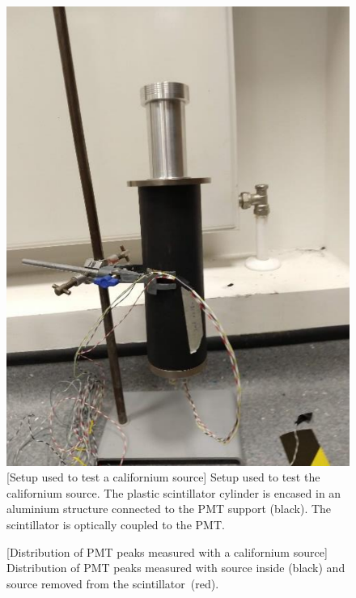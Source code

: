 \begin{figure}
	\begin{minipage}[t]{0.53\textwidth}
		\centering
		\includegraphics[width=0.48\linewidth]{pics/device.png}
		[Setup used to test a californium source]%
		{Setup used to test the californium source.
		The plastic scintillator cylinder is encased in an aluminium structure %
		connected to the PMT support (black).
		The scintillator is optically coupled to the PMT.}
		\label{fig:setup}
	\end{minipage}
	\hfill
	\begin{minipage}[t]{0.45\textwidth}
		\centering
		\resizebox{\textwidth}{!}{}
		[Distribution of PMT peaks measured with a californium source]%
		{Distribution of PMT peaks measured with source inside (black) and source removed from the scintillator~(red).}
		\label{fig:source}
	\end{minipage}
\end{figure}

